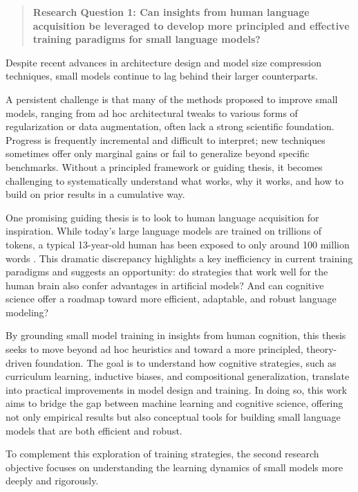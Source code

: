 \begin{quote}
    \textbf{Research Question 1: Can insights from human language acquisition be leveraged to develop more principled and effective training paradigms for small language models?}
\end{quote}

Despite recent advances in architecture design and model size compression techniques, small models continue to lag behind their larger counterparts. 

A persistent challenge is that many of the methods proposed to improve small models, ranging from ad hoc architectural tweaks to various forms of regularization or data augmentation, often lack a strong scientific foundation. Progress is frequently incremental and difficult to interpret; new techniques sometimes offer only marginal gains or fail to generalize beyond specific benchmarks. Without a principled framework or guiding thesis, it becomes challenging to systematically understand what works, why it works, and how to build on prior results in a cumulative way.

One promising guiding thesis is to look to human language acquisition for inspiration. While today's large language models are trained on trillions of tokens, a typical 13-year-old human has been exposed to only around 100 million words \citep{warstadt2023babylm1}. This dramatic discrepancy highlights a key inefficiency in current training paradigms and suggests an opportunity: do strategies that work well for the human brain also confer advantages in artificial models? And can cognitive science offer a roadmap toward more efficient, adaptable, and robust language modeling?

By grounding small model training in insights from human cognition, this thesis seeks to move beyond ad hoc heuristics and toward a more principled, theory-driven foundation. The goal is to understand how cognitive strategies, such as curriculum learning, inductive biases, and compositional generalization, translate into practical improvements in model design and training. In doing so, this work aims to bridge the gap between machine learning and cognitive science, offering not only empirical results but also conceptual tools for building small language models that are both efficient and robust.

To complement this exploration of training strategies, the second research objective focuses on understanding the learning dynamics of small models more deeply and rigorously.

